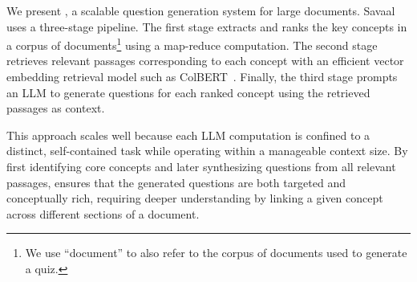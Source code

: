 We present \textbf{\name}, a scalable question generation system for large documents. Savaal uses a three-stage pipeline. The first stage extracts and ranks the key concepts in a corpus of documents\footnote{We use ``document'' to also refer to the corpus of documents used to generate a quiz.} using a map-reduce computation. The second stage retrieves relevant passages corresponding to each concept with an efficient vector embedding retrieval model such as ColBERT~\cite{colbert}. Finally, the third stage prompts an LLM to generate questions for each ranked concept using the retrieved passages as context.

This approach scales well because each LLM computation is confined to a distinct, self-contained task while operating within a manageable context size. By first identifying core concepts and later synthesizing questions from all relevant passages, \name ensures that the generated questions are both targeted and conceptually rich, requiring deeper understanding by linking a given concept across different sections of a document.

